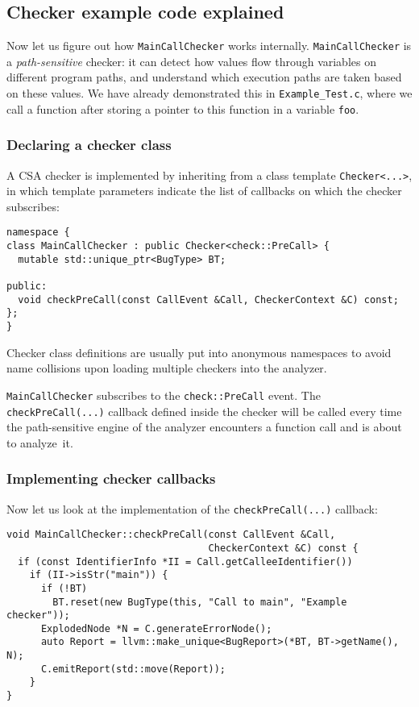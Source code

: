 \documentclass[a4paper,12pt]{article}
\newenvironment{nobr}{\begin{minipage}{\textwidth}\setlength\parskip{1em}
}{\end{minipage}\ignorespacesafterend}
\begin{document}
\subsection{Checker example code explained}\label{subsec:coding_intro}

Now let us figure out how \lstinline|MainCallChecker| works internally. \lstinline|MainCallChecker| is a \emph{path-sensitive} check\-er: it can detect how values flow through variables on different program paths, and understand which execution paths are taken based on these values. We have already demonstrated this in \lstinline|Example_Test.c|, where we call a function after storing a pointer to this function in a variable \lstinline|foo|.

\begin{nobr}
\subsubsection{Declaring a checker class}

A CSA checker is implemented by inheriting from a class template \lstinline|Checker<...>|, in which template parameters indicate the list of callbacks on which the checker subscribes:

\begin{lstlisting}[style=cplusplus,firstnumber=10]
namespace {
class MainCallChecker : public Checker<check::PreCall> {
  mutable std::unique_ptr<BugType> BT;

public:
  void checkPreCall(const CallEvent &Call, CheckerContext &C) const;
};
}
\end{lstlisting}
\end{nobr}

Checker class definitions are usually put into anonymous namespaces to avoid name collisions upon loading multiple checkers into the analyzer.

\lstinline|MainCallChecker| subscribes to the \lstinline|check::PreCall| event. The \lstinline|checkPreCall(...)| callback defined inside the checker will be called every time the path-sensitive engine of the analyzer encounters a function call and is about to analyze~it.

\begin{nobr}
\subsubsection{Implementing checker callbacks}

Now let us look at the implementation of the \lstinline|checkPreCall(...)| callback:
\begin{lstlisting}[style=cplusplus,firstnumber=19]
void MainCallChecker::checkPreCall(const CallEvent &Call,
                                   CheckerContext &C) const {
  if (const IdentifierInfo *II = Call.getCalleeIdentifier())
    if (II->isStr("main")) {
      if (!BT)
        BT.reset(new BugType(this, "Call to main", "Example checker"));
      ExplodedNode *N = C.generateErrorNode();
      auto Report = llvm::make_unique<BugReport>(*BT, BT->getName(), N);
      C.emitReport(std::move(Report));
    }
}
\end{lstlisting}
\end{nobr}
\end{document}
